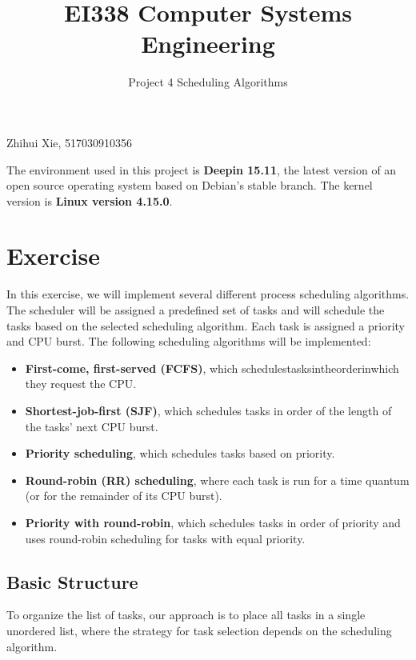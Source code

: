 \documentclass{article}
\title{EI338 Computer Systems Engineering}
\author{Project 4 Scheduling Algorithms}
\begin{document}
\maketitle

\begin{center}
    Zhihui Xie, 517030910356
\end{center}

The environment used in this project is \textbf{Deepin 15.11}, the latest version of an open source operating system based on Debian's stable branch. The kernel version is \textbf{Linux version 4.15.0}.

\section*{Exercise}
In this exercise, we will implement several different process scheduling algorithms. The scheduler will be assigned a predefined set of tasks and will
schedule the tasks based on the selected scheduling algorithm. Each task is
assigned a priority and CPU burst. The following scheduling algorithms will
be implemented:

\begin{itemize}
    \item \textbf{First-come, first-served (FCFS)}, which schedulestasksintheorderinwhich
    they request the CPU.

    \item \textbf{Shortest-job-first (SJF)}, which schedules tasks in order of the length of the
    tasks’ next CPU burst.

    \item \textbf{Priority scheduling}, which schedules tasks based on priority.
    
    \item \textbf{Round-robin (RR) scheduling}, where each task is run for a time quantum
    (or for the remainder of its CPU burst).

    \item \textbf{Priority with round-robin}, which schedules tasks in order of priority and
    uses round-robin scheduling for tasks with equal priority.
\end{itemize}

\subsection*{Basic Structure}
To organize the list of tasks,  our approach is to place all tasks in a single unordered list, where the strategy for task selection depends on the scheduling
algorithm. 
\end{document}
